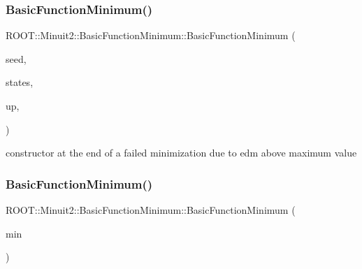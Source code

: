 \subsubsection{\texorpdfstring{BasicFunctionMinimum()}{BasicFunctionMinimum()}\hspace{0.1cm}{\footnotesize\ttfamily [4/15]}}
{\footnotesize\ttfamily R\+O\+O\+T\+::\+Minuit2\+::\+Basic\+Function\+Minimum\+::\+Basic\+Function\+Minimum (\begin{DoxyParamCaption}\item[{const \mbox{\hyperlink{classROOT_1_1Minuit2_1_1MinimumSeed}{Minimum\+Seed}} \&}]{seed,  }\item[{const std\+::vector$<$ \mbox{\hyperlink{classROOT_1_1Minuit2_1_1MinimumState}{Minimum\+State}} $>$ \&}]{states,  }\item[{double}]{up,  }\item[{\mbox{\hyperlink{classROOT_1_1Minuit2_1_1BasicFunctionMinimum_1_1MnAboveMaxEdm}{Mn\+Above\+Max\+Edm}}}]{ }\end{DoxyParamCaption})\hspace{0.3cm}{\ttfamily [inline]}}



constructor at the end of a failed minimization due to edm above maximum value 

\mbox{\label{classROOT_1_1Minuit2_1_1BasicFunctionMinimum_ae0812dcb933989ffd9e096792367d0b7}} 
\subsubsection{\texorpdfstring{BasicFunctionMinimum()}{BasicFunctionMinimum()}\hspace{0.1cm}{\footnotesize\ttfamily [5/15]}}
{\footnotesize\ttfamily R\+O\+O\+T\+::\+Minuit2\+::\+Basic\+Function\+Minimum\+::\+Basic\+Function\+Minimum (\begin{DoxyParamCaption}\item[{const \mbox{\hyperlink{classROOT_1_1Minuit2_1_1BasicFunctionMinimum}{Basic\+Function\+Minimum}} \&}]{min }\end{DoxyParamCaption})\hspace{0.3cm}{\ttfamily [inline]}}



